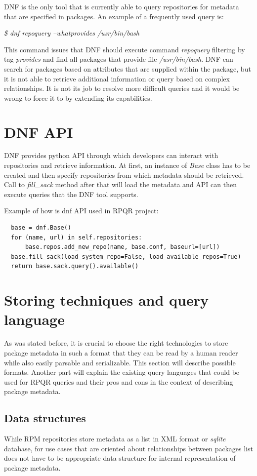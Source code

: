DNF is the only tool that is currently able to query repositories for metadata that are specified
in packages. An example of a frequently used query is:

\textit{\$ dnf repoquery --whatprovides /usr/bin/bash}

This command issues that DNF should execute command \textit{repoquery} filtering by tag \mbox{\textit{provides}}
and find all packages that provide file \textit{/usr/bin/bash}. DNF can search for packages based on
attributes that are supplied within the package, but it is not able to retrieve additional information
or query based on complex relationships. It is not its job to resolve more difficult queries and
it would be wrong to force it to by extending its capabilities.

\section{DNF API}
DNF provides python API through which developers can interact with repositories and retrieve information.
At first, an instance of \textit{Base} class has to be created and then specify repositories from which
metadata should be retrieved. Call to \textit{fill\_sack} method after that will load the metadata
and API can then execute queries that the DNF tool supports.

Example of how is dnf API used in RPQR project:
\begin{lstlisting}
  base = dnf.Base()
  for (name, url) in self.repositories:
      base.repos.add_new_repo(name, base.conf, baseurl=[url])
  base.fill_sack(load_system_repo=False, load_available_repos=True)
  return base.sack.query().available()
\end{lstlisting}

\section{Storing techniques and query language}
As was stated before, it is crucial to choose the right technologies to store package metadata in
such a format that they can be read by a human reader while also easily parsable and serializable.
This section will describe possible formats. Another part will explain the existing query
languages that could be used for RPQR queries and their pros and cons in the context of describing
package metadata.

\subsection*{Data structures}
While RPM repositories store metadata as a list in XML format or \textit{sqlite} database, for use cases that
are oriented about relationships between packages list does not have to be appropriate data
structure for internal representation of package metadata.

